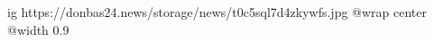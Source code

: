  
 
 
 
 

\ifcmt
  ig https://donbas24.news/storage/news/t0c5sql7d4zkywfs.jpg
  @wrap center
  @width 0.9
\fi
